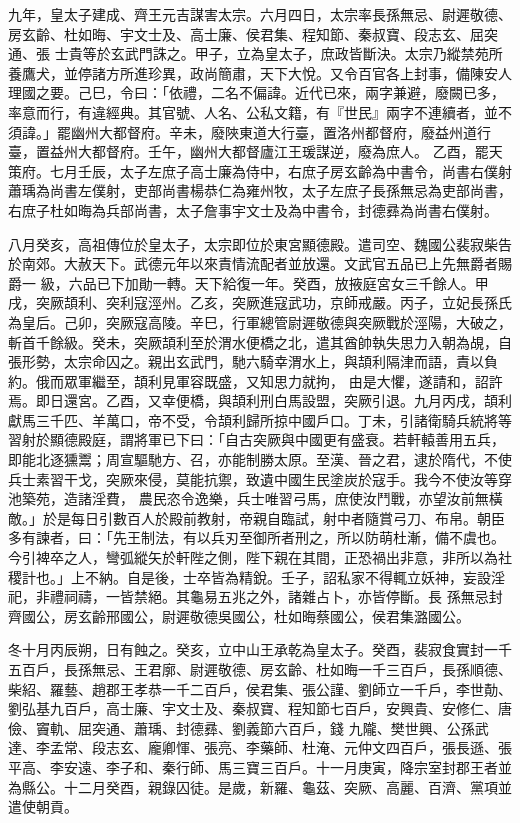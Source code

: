\begin{pinyinscope}
 九年，皇太子建成、齊王元吉謀害太宗。六月四日，太宗率長孫無忌、尉遲敬德、房玄齡、杜如晦、宇文士及、高士廉、侯君集、程知節、秦叔寶、段志玄、屈突通、張
 士貴等於玄武門誅之。甲子，立為皇太子，庶政皆斷決。太宗乃縱禁苑所養鷹犬，並停諸方所進珍異，政尚簡肅，天下大悅。又令百官各上封事，備陳安人理國之要。己巳，令曰：「依禮，二名不偏諱。近代已來，兩字兼避，廢闕已多，率意而行，有違經典。其官號、人名、公私文籍，有『世民』兩字不連續者，並不須諱。」罷幽州大都督府。辛未，廢陜東道大行臺，置洛州都督府，廢益州道行臺，置益州大都督府。壬午，幽州大都督廬江王瑗謀逆，廢為庶人。
 乙酉，罷天策府。七月壬辰，太子左庶子高士廉為侍中，右庶子房玄齡為中書令，尚書右僕射蕭瑀為尚書左僕射，吏部尚書楊恭仁為雍州牧，太子左庶子長孫無忌為吏部尚書，右庶子杜如晦為兵部尚書，太子詹事宇文士及為中書令，封德彞為尚書右僕射。



 八月癸亥，高祖傳位於皇太子，太宗即位於東宮顯德殿。遣司空、魏國公裴寂柴告於南郊。大赦天下。武德元年以來責情流配者並放還。文武官五品已上先無爵者賜爵一
 級，六品已下加勛一轉。天下給復一年。癸酉，放掖庭宮女三千餘人。甲戌，突厥頡利、突利寇涇州。乙亥，突厥進寇武功，京師戒嚴。丙子，立妃長孫氏為皇后。己卯，突厥寇高陵。辛巳，行軍總管尉遲敬德與突厥戰於涇陽，大破之，斬首千餘級。癸未，突厥頡利至於渭水便橋之北，遣其酋帥執失思力入朝為覘，自張形勢，太宗命囚之。親出玄武門，馳六騎幸渭水上，與頡利隔津而語，責以負約。俄而眾軍繼至，頡利見軍容既盛，又知思力就拘，
 由是大懼，遂請和，詔許焉。即日還宮。乙酉，又幸便橋，與頡利刑白馬設盟，突厥引退。九月丙戌，頡利獻馬三千匹、羊萬口，帝不受，令頡利歸所掠中國戶口。丁未，引諸衛騎兵統將等習射於顯德殿庭，謂將軍已下曰：「自古突厥與中國更有盛衰。若軒轅善用五兵，即能北逐獯鬻；周宣驅馳方、召，亦能制勝太原。至漢、晉之君，逮於隋代，不使兵士素習干戈，突厥來侵，莫能抗禦，致遺中國生民塗炭於寇手。我今不使汝等穿池築苑，造諸淫費，
 農民恣令逸樂，兵士唯習弓馬，庶使汝鬥戰，亦望汝前無橫敵。」於是每日引數百人於殿前教射，帝親自臨試，射中者隨賞弓刀、布帛。朝臣多有諫者，曰：「先王制法，有以兵刃至御所者刑之，所以防萌杜漸，備不虞也。今引裨卒之人，彎弧縱矢於軒陛之側，陛下親在其間，正恐禍出非意，非所以為社稷計也。」上不納。自是後，士卒皆為精銳。壬子，詔私家不得輒立妖神，妄設淫祀，非禮祠禱，一皆禁絕。其龜易五兆之外，諸雜占卜，亦皆停斷。長
 孫無忌封齊國公，房玄齡邢國公，尉遲敬德吳國公，杜如晦蔡國公，侯君集潞國公。



 冬十月丙辰朔，日有蝕之。癸亥，立中山王承乾為皇太子。癸酉，裴寂食實封一千五百戶，長孫無忌、王君廓、尉遲敬德、房玄齡、杜如晦一千三百戶，長孫順德、柴紹、羅藝、趙郡王孝恭一千二百戶，侯君集、張公謹、劉師立一千戶，李世勣、劉弘基九百戶，高士廉、宇文士及、秦叔寶、程知節七百戶，安興貴、安修仁、唐儉、竇軌、屈突通、蕭瑀、封德彞、劉義節六百戶，錢
 九隴、樊世興、公孫武達、李孟常、段志玄、龐卿惲、張亮、李藥師、杜淹、元仲文四百戶，張長遜、張平高、李安遠、李子和、秦行師、馬三寶三百戶。十一月庚寅，降宗室封郡王者並為縣公。十二月癸酉，親錄囚徒。是歲，新羅、龜茲、突厥、高麗、百濟、黨項並遣使朝貢。




\end{pinyinscope}
